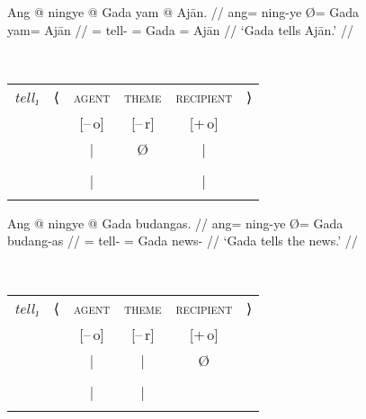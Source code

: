 \begin{figure}
\pex\label{ex:intrnzn_act}
\a\label{ex:intrnzn_act_1}%
\ljudge\ques\begin{minipage}[t]{.4\remaining}
\begingl
	\gla Ang @ ningye {} @ Gada yam @ Ajān. //
	\glb ang= ning-ye Ø= Gada yam= Ajān //
	\glc \AgtT{}= tell-\TsgF{} \Top{}= Gada \Dat{}= Ajān //
	\glft `Gada tells Ajān.' //
\endgl
\end{minipage}
~
\begin{tabular}[t]{>{\itshape}l l c c c r}
tell₁
	& ⟨
	& \textsc{agent}
	& \textsc{theme}
	& \textsc{recipient}
	& ⟩
	\\
%
	& %
	& [–\,o]
	& [–\,r]
	& [+\,o]
	& %
	\\

%
	& %
	& |
	& Ø
	& |
	& %
	\\

%
	& %
	& \Subj*
	& %
	& \Obj
	& %
	\\

%
	& %
	& |
	& %
	& |
	& %
	\\

%
	& %
	& \fw{Gada}
	& %
	& \fw{Ajān}
	& %
	\\
\end{tabular}

\a\label{ex:intrnzn_act_2}%
\begin{minipage}[t]{.4\remaining}
\begingl
	\gla Ang @ ningye {} @ Gada budangas. //
	\glb ang= ning-ye Ø= Gada budang-as //
	\glc \AgtT{}= tell-\TsgF{} \Top{}= Gada news-\Parg{} //
	\glft `Gada tells the news.' //
\endgl
\end{minipage}
~
\begin{tabular}[t]{>{\itshape}l l c c c r}
tell₁
	& ⟨
	& \textsc{agent}
	& \textsc{theme}
	& \textsc{recipient}
	& ⟩
	\\
%
	& %
	& [–\,o]
	& [–\,r]
	& [+\,o]
	& %
	\\

%
	& %
	& |
	& |
	& Ø
	& %
	\\

%
	& %
	& \Subj*
	& \SObj
	& %
	& %
	\\

%
	& %
	& |
	& |
	& %
	& %
	\\

%
	& %
	& \fw{Gada}
	& \fw{news}
	& %
	& %
	\\
\end{tabular}

\xe
\end{figure}


